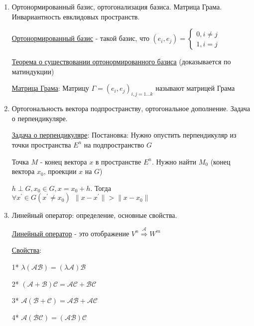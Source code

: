 \documentclass[12pt]{article}
\begin{document}
\begin{enumerate}
        \item Ортонормированный базис, ортогонализация базиса. Матрица Грама. Инвариантность евклидовых пространств.

        \hyperlink{ortonormalizedbasis}{Ортонормированный базис} - такой базис, что $(e_i, e_j) = \begin{cases}
                                                                                                      0, i \neq j \\ 1, i = j
        \end{cases}$

        \hyperlink{orthogonalbasisinspace}{Теорема о существовании ортонормированного базиса} (доказывается по матиндукции)


        \hyperlink{grammatrix}{Матрица Грама}: Матрицу $\Gamma = {(e_i, e_j)}_{i, j = 1\dots k}$ называют матрицей Грама

        \item Ортогональность вектора подпространству, ортогональное дополнение. Задача о перпендикуляре.

        \hyperlink{perpendicularproblem}{Задача о перпендикуляре}: Постановка: Нужно опустить перпендикуляр из точки пространства $E^n$ на подпространство $G$

        Точка $M$ - конец вектора $x$ в пространстве $E^n$.
        Нужно найти $M_0$ (конец вектора $x_0$, проекции $x$ на $G$)

        \Ths $h \perp G, x_0 \in G, x = x_0 + h$. Тогда $\forall x^\prime \in G (x^\prime \neq x_0) \ \ \|x - x^\prime\| > \|x - x_0\|$

        \item Линейный оператор: определение, основные свойства.

        \hyperlink{linearoperatordefinition}{Линейный оператор} - это отображение $V^n \stackrel{\mathcal{A}}{\Longrightarrow} W^m$

        \hyperlink{linearoperatorproperties}{Свойства}:

        1* $\lambda (\mathcal{A}\mathcal{B}) = (\lambda \mathcal{A})\mathcal{B}$

        2* $(\mathcal{A} + \mathcal{B}) \mathcal{C} = \mathcal{A}\mathcal{C} + \mathcal{B}\mathcal{C}$

        3* $\mathcal{A} (\mathcal{B} + \mathcal{C}) = \mathcal{A}\mathcal{B} + \mathcal{A}\mathcal{C}$

        4* $\mathcal{A} (\mathcal{B}\mathcal{C}) = (\mathcal{A}\mathcal{B}) \mathcal{C}$



\end{enumerate}
\end{document}
